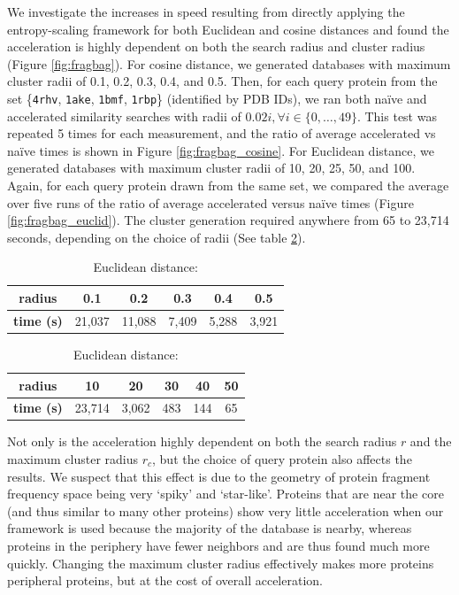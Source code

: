 \documentclass[review,preprint,12pt]{elsarticle}
\theoremstyle{definition}
\theoremstyle{remark}
\numberwithin{equation}{section}
\begin{document}
We investigate the increases in speed resulting from directly applying the entropy-scaling framework for both Euclidean and cosine distances and found the acceleration is highly dependent on both the search radius and cluster radius (Figure \ref{fig:fragbag}).
For cosine distance, we generated databases with maximum cluster radii of 0.1, 0.2, 0.3, 0.4, and 0.5.
Then, for each query protein from the set \{\texttt{4rhv}, \texttt{1ake}, \texttt{1bmf}, \texttt{1rbp}\} (identified by PDB IDs), we ran both na\"ive and accelerated similarity searches with radii of $0.02i, \forall i \in \{0,\ldots,49\}$.
This test was repeated 5 times for each measurement, and the ratio of average accelerated vs na\"ive times is shown in Figure \ref{fig:fragbag_cosine}.
For Euclidean distance, we generated databases with maximum cluster radii of 10, 20, 25, 50, and 100.
Again, for each query protein drawn from the same set, we compared the average over five runs of the ratio of average accelerated versus na\"ive times (Figure \ref{fig:fragbag_euclid}).
The cluster generation required anywhere from 65 to 23,714 seconds, depending on the choice of radii (See table \ref{tab:esfragbag_clustering}).
\begin{table}
\caption{Cluster generation time for esFragBag}
\label{tab:esfragbag_clustering}
\begin{subtable}{1\textwidth}
    \centering
\caption{Cosine distance:}
\begin{tabular}{c|ccccc}
\hline
\textbf{radius} & 0.1 & 0.2 & 0.3 & 0.4 &  0.5 \\
\hline
\textbf{time (s)} & 21,037 & 11,088 & 7,409 & 5,288 & 3,921 \\
\hline
\end{tabular}
\end{subtable}

\vspace{1em}
\begin{subtable}{1\textwidth}
    \centering
\caption{Euclidean distance:}
\begin{tabular}{c|ccccc}
\hline
\textbf{radius} & 10 & 20 & 30 & 40 & 50 \\
\hline
\textbf{time (s)} & 23,714 & 3,062 & 483 & 144 & 65 \\
\hline
\end{tabular}
\end{subtable}
\end{table}

Not only is the acceleration highly dependent on both the search radius $r$ and the maximum cluster radius $r_c$,
but the choice of query protein also affects the results.
We suspect that this effect is due to the geometry of protein fragment frequency space being very `spiky' and `star-like'.
Proteins that are near the core (and thus similar to many other proteins) show very little acceleration when our framework is used because the majority of the database is nearby, whereas proteins in the periphery have fewer neighbors and are thus found much more quickly.
Changing the maximum cluster radius effectively makes more proteins peripheral proteins, but at the cost of overall acceleration.
\end{document}
